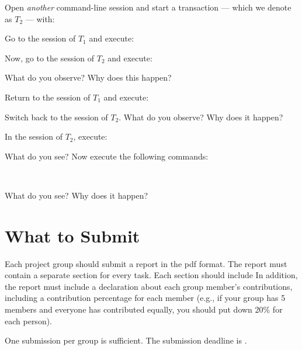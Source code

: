 \vgap

\noindent Open {\em another} command-line session and start a transaction --- which we denote as $T_2$ --- with:

\vgap

\noindent {}

\vgap

\noindent Go to the session of $T_1$ and execute:

\vgap

\noindent {}

\vgap

\noindent Now, go to the session of $T_2$ and execute:

\vgap

\noindent {}

\vgap

\noindent What do you observe? Why does this happen?

\vgap

\noindent Return to the session of $T_1$ and execute:

\vgap

\noindent {}

\vgap

\noindent Switch back to the session of $T_2$. What do you observe? Why does it happen?

\vgap

\noindent In the session of $T_2$, execute:

\vgap

\noindent {}

\vgap

\noindent What do you see? Now execute the following commands:

\vgap

\noindent {}  \\
\noindent {}

\vgap

\noindent What do you see? Why does it happen?

\section{What to Submit}

Each project group should submit a report in the pdf format. The report must contain a separate section for every task. Each section should include
In addition, the report must include a declaration about each group member's contributions, including a contribution percentage for each member (e.g., if your group has 5 members and everyone has contributed equally, you should put down 20\% for each person).

\vgap

One submission per group is sufficient. The submission deadline is .



